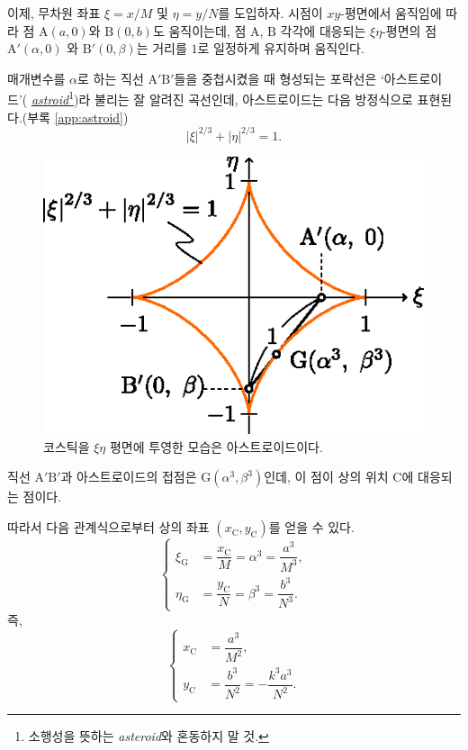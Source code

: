 \documentclass[twocolumn]{article}
\begin{document}
이제, 무차원 좌표 $\xi=x/M$ 및 $\eta=y/N$를 도입하자. 시점이 $xy$-평면에서 움직임에 따라 점 $\mathrm{A}(a, 0)$와 $\mathrm{B}(0, b)$도 움직이는데, 점 $\mathrm{A}$, $\mathrm{B}$ 각각에 대응되는  $\xi\eta$-평면의 점 $\mathrm{A'}(\alpha, 0)$
와 $\mathrm{B'}(0, \beta)$는 거리를 $1$로 일정하게 유지하며 움직인다.

매개변수를 $\alpha$로 하는 직선 ${\mathrm{A'B'}}$들을 중첩시켰을 때 형성되는 포락선은 `아스트로이드'(%
\href{https://en.wikipedia.org/wiki/Astroid}{\emph{astroid}}\footnote{
소행성을 뜻하는 \emph{asteroid}와 혼동하지 말 것.})라 불리는 잘 알려진 곡선인데, 아스트로이드는 다음 방정식으로 표현된다.(부록 \ref{app:astroid})
$$ \left| \xi \right|^{2/3} + \left| \eta \right|^{2/3} = 1. $$

\begin{figure}
	\centering
	\includegraphics{figs/g107.eps}	
	\caption{코스틱을 $\xi\eta$ 평면에 투영한 모습은 아스트로이드이다.}
	\label{fig:astroid}
\end{figure}

직선 ${\mathrm{A'B'}}$과
아스트로이드의 접점은 $\mathrm{G}(\alpha^3, \beta^3)$인데, 이 점이 상의 위치 $\mathrm{C}$에 대응되는 점이다.
	
따라서 다음 관계식으로부터 상의 좌표 $(x_{\mathrm{C}}^{}, y_{\mathrm{C}}^{})$를 얻을 수 있다.
$$ \left\{ 
\begin{aligned}
	\xi_{\mathrm{G}}^{} &= \dfrac{x_{\mathrm{C}}^{}}{M} = \alpha^3 = \dfrac{a^3}{M^3},\\
	\eta_{\mathrm{G}}^{} &= \dfrac{y_{\mathrm{C}}^{}}{N} = \beta^3 = \dfrac{b^3}{N^3}.
\end{aligned}
\right.$$
즉,
$$ \left\{ 
\begin{aligned}
	x_{\mathrm{C}}^{} &= \dfrac{a^3}{M^2},\\
	y_{\mathrm{C}}^{} &= \dfrac{b^3}{N^2}=-\dfrac{k^3a^3}{N^2}.
\end{aligned}
\right.$$
\end{document}
